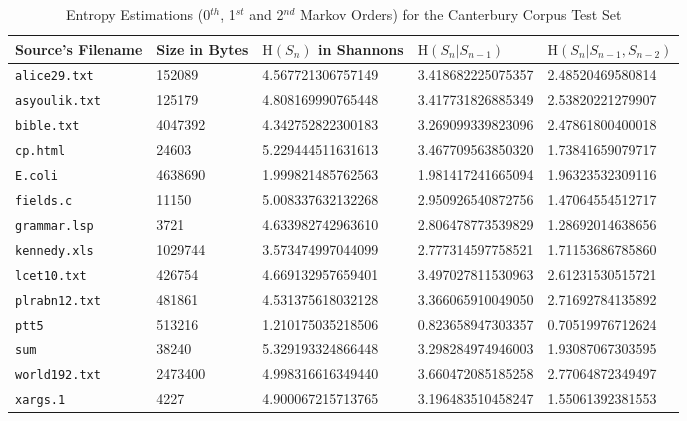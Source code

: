 \documentclass[a4paper, twocolumn]{article}
\begin{document}
    \begin{table*}[t]
        \centering
        \begin{tabular}{lllll}
        \toprule
            Source's Filename & Size in Bytes & $\mathrm{H}(S_n)$ in Shannons & $\mathrm{H}(S_n | S_{n-1})$ & $\mathrm{H}(S_n | S_{n-1}, S_{n-2})$ \\
        \midrule
            \texttt{alice29.txt} & 152089 & 4.567721306757149 & 3.418682225075357 & 2.48520469580814 \\
            \texttt{asyoulik.txt} & 125179 & 4.808169990765448 & 3.417731826885349 & 2.53820221279907 \\
            \texttt{bible.txt} & 4047392 & 4.342752822300183 & 3.269099339823096 & 2.47861800400018 \\
            \texttt{cp.html} & 24603 & 5.229444511631613 & 3.467709563850320 & 1.73841659079717 \\
            \texttt{E.coli} & 4638690 & 1.999821485762563 & 1.981417241665094 & 1.96323532309116 \\
            \texttt{fields.c} & 11150 & 5.008337632132268 & 2.950926540872756 & 1.47064554512717 \\
            \texttt{grammar.lsp} & 3721 & 4.633982742963610 & 2.806478773539829 & 1.28692014638656 \\
            \texttt{kennedy.xls} & 1029744 & 3.573474997044099 & 2.777314597758521 & 1.71153686785860 \\
            \texttt{lcet10.txt} & 426754 & 4.669132957659401 & 3.497027811530963 & 2.61231530515721 \\
            \texttt{plrabn12.txt} & 481861 & 4.531375618032128 & 3.366065910049050 & 2.71692784135892 \\
            \texttt{ptt5} & 513216 & 1.210175035218506 & 0.823658947303357 & 0.70519976712624 \\
            \texttt{sum} & 38240 & 5.329193324866448 & 3.298284974946003 & 1.93087067303595 \\
            \texttt{world192.txt} & 2473400 & 4.998316616349440 & 3.660472085185258 & 2.77064872349497 \\
            \texttt{xargs.1} & 4227 & 4.900067215713765 & 3.196483510458247 & 1.55061392381553 \\
        \bottomrule
        \end{tabular}
        \caption{Entropy Estimations (0$^{th}$, 1$^{st}$ and 2$^{nd}$ Markov Orders) for the Canterbury Corpus Test Set}
        \label{tab:canterbury}
    \end{table*}
\end{document}

